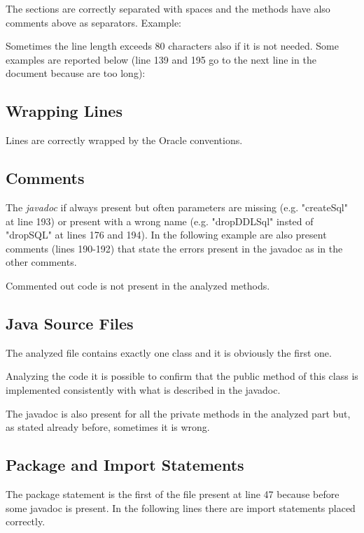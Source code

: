 \documentclass[a4paper]{article}
\begin{document}
The sections are correctly separated with spaces and the methods have also comments above as separators.
Example:

\newpage
Sometimes the line length exceeds 80 characters also if it is not needed. Some examples are reported below (line 139 and 195 go to the next line in the document because are too long):

\subsection{Wrapping Lines}
Lines are correctly wrapped by the Oracle conventions.

\subsection{Comments}

The \emph{javadoc} if always present but often parameters are missing (e.g. "createSql" at line 193) or present with a wrong name (e.g. "dropDDLSql" insted of "dropSQL" at lines 176 and 194). In the following example are also present comments (lines 190-192) that state the errors present in the javadoc as in the other comments. 

Commented out code is not present in the analyzed methods.

\subsection{Java Source Files}

The analyzed file contains exactly one class and it is obviously the first one.

Analyzing the code it is possible to confirm that the public method of this class is implemented consistently with what is described in the javadoc.

The javadoc is also present for all the private methods in the analyzed part but, as stated already before, sometimes it is wrong.

\subsection{Package and Import Statements}

The package statement is the first of the file present at line 47 because before some javadoc is present.
In the following lines there are import statements placed correctly.
\end{document}
